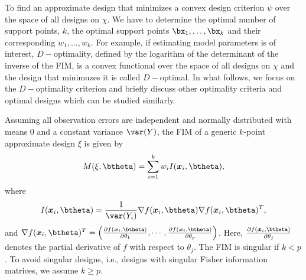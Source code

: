 To find an approximate design that minimizes a convex design  criterion $\psi$ over the space of all designs on $\chi$.
We have to determine the optimal number of support points, $k$, the optimal support points $\bx_1,\ldots,\bx_k$ and their corresponding $w_1,\ldots,w_k$. For example, if estimating model parameters is of interest,  $D-$optimality, defined by the logarithm of the determinant of the  inverse of the FIM, is a convex functional  over the space of all designs on $\chi$ \citep{fedorov2013optimal, silvey1980} and the design that minimuzes it is  called $D-$optimal. In what follows, we  focus on the $D-$optimality criterion and briefly discuss other  optimality criteria and optimal designs which can be studied similarly.


Assuming  all observation errors are independent and normally distributed  with means $0$ and a constant variance $\var(Y)$,   the  FIM of a generic $k$-point approximate  design $\xi$ is given by
\begin{equation}
\label{eq:FIM}
M(\xi,\btheta) =  \sum_{i=1}^k w_i I(\boldsymbol{x}_i,\btheta),
\end{equation}
where
\begin{equation*}
I(\boldsymbol{x}_i,\btheta) = \frac{1}{\var(Y_i)}\nabla f(\boldsymbol{x}_i,\btheta)\nabla f(\boldsymbol{x}_i,\btheta)^T,
\end{equation*}
and
$\nabla f(\boldsymbol{x}_i,\btheta)^T=\left(
  \frac{\partial f(\boldsymbol{x}_i,\btheta)}{\partial \theta_1},
  \cdots,\frac{\partial f(\boldsymbol{x}_i,\btheta)}{\partial \theta_p}
  \right)$.
Here, $\frac{\partial f(\boldsymbol{x}_i,\btheta)}{\partial \theta_j}$
  denotes the partial derivative of $f$ with respect to $\theta_j$.
The  FIM  is singular if  $k < p$. To avoid singular designs, i.e., designs with singular Fisher information matrices,  we assume  $k\geq p$.


